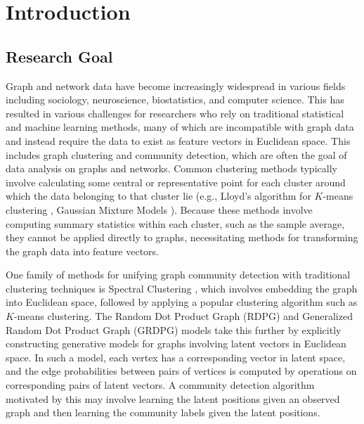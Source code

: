 \documentclass[
  11pt,
]{article}
\begin{document}
\hypertarget{introduction}{%
\section{Introduction}\label{introduction}}

\hypertarget{research-goal}{%
\subsection{Research Goal}\label{research-goal}}

Graph and network data have become increasingly widespread in various
fields including sociology, neuroscience, biostatistics, and computer
science. This has resulted in various challenges for researchers who
rely on traditional statistical and machine learning methods, many of
which are incompatible with graph data and instead require the data to
exist as feature vectors in Euclidean space. This includes graph
clustering and community detection, which are often the goal of data
analysis on graphs and networks. Common clustering methods typically
involve calculating some central or representative point for each
cluster around which the data belonging to that cluster lie (e.g.,
Lloyd's algorithm for \(K\)-means clustering \cite{1056489}, Gaussian
Mixture Models \cite{doi:10.1198/016214502760047131}). Because these
methods involve computing summary statistics within each cluster, such
as the sample average, they cannot be applied directly to graphs,
necessitating methods for transforming the graph data into feature
vectors.

One family of methods for unifying graph community detection with
traditional clustering techniques is Spectral Clustering
\cite{DBLP:journals/corr/abs-0711-0189}, which involves embedding the
graph into Euclidean space, followed by applying a popular clustering
algorithm such as \(K\)-means clustering. The Random Dot Product Graph
(RDPG) \cite{10.1007/978-3-540-77004-6_11} and Generalized Random Dot
Product Graph (GRDPG) \cite{rubindelanchy2017statistical} models take
this further by explicitly constructing generative models for graphs
involving latent vectors in Euclidean space. In such a model, each
vertex has a corresponding vector in latent space, and the edge
probabilities between pairs of vertices is computed by operations on
corresponding pairs of latent vectors. A community detection algorithm
motivated by this may involve learning the latent positions given an
observed graph and then learning the community labels given the latent
positions.
\end{document}
